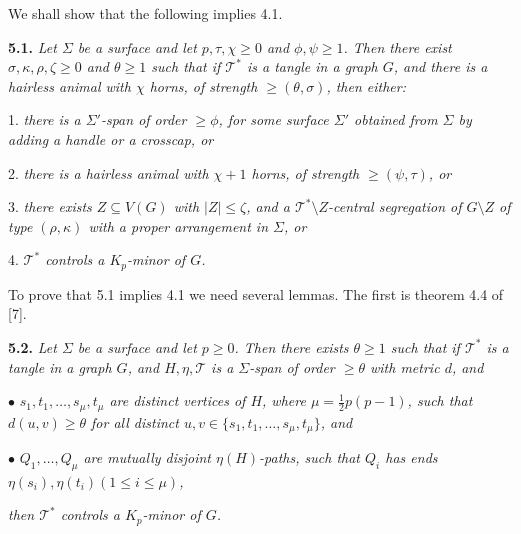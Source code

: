 We shall show that the following implies 4.1.

\textbf{5.1.} \textit{Let $\Sigma$ be a surface and let $p, \tau, \chi \ge 0$ and $\phi, \psi \ge 1$. Then there exist $\sigma, \kappa, \rho, \zeta \ge 0$ and $\theta \ge 1$ such that if $\mathscr{T}^*$ is a tangle in a graph $G$, and there is a hairless animal with $\chi$ horns, of strength $\ge (\theta, \sigma)$, then either:}

\hspace*{12pt}1. \textit{there is a $\Sigma'$-span of order $\ge \phi$, for some surface $\Sigma'$ obtained from $\Sigma$ by adding a handle or a crosscap, or}

\hspace*{12pt}2. \textit{there is a hairless animal with $\chi + 1$ horns, of strength $\ge (\psi, \tau)$, or}

\hspace*{12pt}3. \textit{there exists $Z \subseteq V(G)$ with $|Z| \le \zeta$, and a $\mathscr{T}^* \setminus Z$-central segregation of $G \setminus Z$ of type $(\rho, \kappa)$ with a proper arrangement in $\Sigma$, or}

\hspace*{12pt}4. \textit{$\mathscr{T}^*$ controls a $K_p$-minor of $G$.}

To prove that 5.1 implies 4.1 we need several lemmas. The first is theorem 4.4 of [7].

\textbf{5.2.} \textit{Let $\Sigma$ be a surface and let $p \ge 0$. Then there exists $\theta \ge 1$ such that if $\mathscr{T}^*$ is a tangle in a graph $G$, and $H, \eta, \mathscr{T}$ is a $\Sigma$-span of order $\ge \theta$ with metric $d$, and}

\hspace*{12pt}$\bullet$ \textit{$s_1, t_1, \dots, s_\mu, t_\mu$ are distinct vertices of $H$, where $\mu = \frac{1}{2}p(p - 1)$, such that $d(u, v) \ge \theta$ for all distinct $u, v \in \{s_1, t_1, \dots, s_\mu, t_\mu\}$, and}

\hspace*{12pt}$\bullet$ \textit{$Q_1, \dots, Q_\mu$ are mutually disjoint $\eta(H)$-paths, such that $Q_i$ has ends $\eta(s_i), \eta(t_i) (1 \le i \le \mu)$,}

\textit{then $\mathscr{T}^*$ controls a $K_p$-minor of $G$.}
